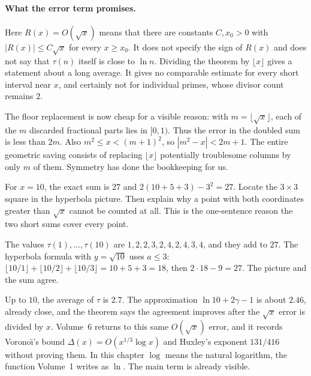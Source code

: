 \paragraph{What the error term promises.}
Here $R(x)=O(\sqrt x)$ means that there are constants $C,x_0>0$ with
$|R(x)|\le C\sqrt x$ for every $x\ge x_0$. It does not specify the sign
of $R(x)$ and does not say that $\tau(n)$ itself is close to $\ln n$.
Dividing the theorem by $\lfloor x\rfloor$ gives a statement about a
long average. It gives no comparable estimate for every short interval near
$x$, and certainly not for individual primes, whose divisor count remains $2$.

The floor replacement is now cheap for a visible reason: with
$m=\lfloor\sqrt x\rfloor$, each of the $m$ discarded fractional parts lies
in $[0,1)$. Thus the error in the doubled sum is less than $2m$.
Also $m^2\le x<(m+1)^2$, so $|m^2-x|<2m+1$. The entire geometric
saving consists of replacing $\lfloor x\rfloor$ potentially troublesome
columns by only $m$ of them. Symmetry has done the bookkeeping for us.

\begin{think}
For $x=10$, the exact sum is $27$ and
$2(10+5+3)-3^2=27$. Locate the $3\times3$ square in the hyperbola picture.
Then explain why a point with both coordinates greater than $\sqrt x$ cannot
be counted at all. This is the one-sentence reason the two short sums cover
every point.
\end{think}

\begin{examplex}[the divisor sum at $x=10$]
The values $\tau(1),\ldots,\tau(10)$ are $1,2,2,3,2,4,2,4,3,4$, and they add to $27$.
The hyperbola formula with $y=\sqrt{10}$ uses $a\le 3$: $\lfloor 10/1\rfloor+\lfloor 10/2\rfloor+\lfloor 10/3\rfloor=10+5+3=18$, then $2\cdot 18-9=27$.
The picture and the sum agree.
\end{examplex}

\begin{examplex}
Up to $10$, the average of $\tau$ is $2.7$. The approximation $\ln 10+2\gamma-1$ is about $2.46$, already close, and the theorem says the agreement improves after the $\sqrt x$ error is divided by $x$. Volume~6 returns to this same $O(\sqrt x)$ error, and it records Vorono\"\i's bound $\Delta(x)=O(x^{1/3}\log x)$ and Huxley's exponent $131/416$ without proving them. In this chapter $\log$ means the natural logarithm, the function Volume~1 writes as $\ln$. The main term is already visible.
\end{examplex}

